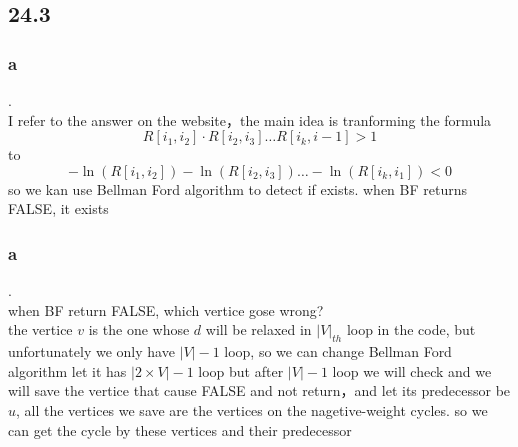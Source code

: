 \documentclass[a4paper,UTF8]{article}
\theoremstyle{definition}
\begin{document}
\subsection*{24.3}
\subsubsection*{a}
.\\
I refer to the answer on the website，the main idea is tranforming the formula
$$R[i_1,i_2]\cdot R[i_2,i_3]\ldots R[i_k,i-1]>1$$
to
$$-\ln(R[i_1,i_2])-\ln(R[i_2,i_3])\ldots -\ln(R[i_k,i_1])<0$$
so we kan use Bellman Ford algorithm to detect if exists.
when BF returns FALSE, it exists
\subsubsection*{a}
.\\
when BF return FALSE, which vertice gose wrong?\\
the vertice $v$ is the one whose $d$ will be relaxed in $|V|_{th}$ loop in the code, but
unfortunately we only have $|V|-1$ loop, so we can change Bellman Ford algorithm
let it has $|2×V|-1$ loop but after $|V|-1$ loop we will check and we will save the vertice
that cause FALSE and not return，and let its predecessor be $u$, all the vertices we save are the vertices on the nagetive-weight cycles.
so we can get the cycle by these vertices and their predecessor\\
\end{document}
